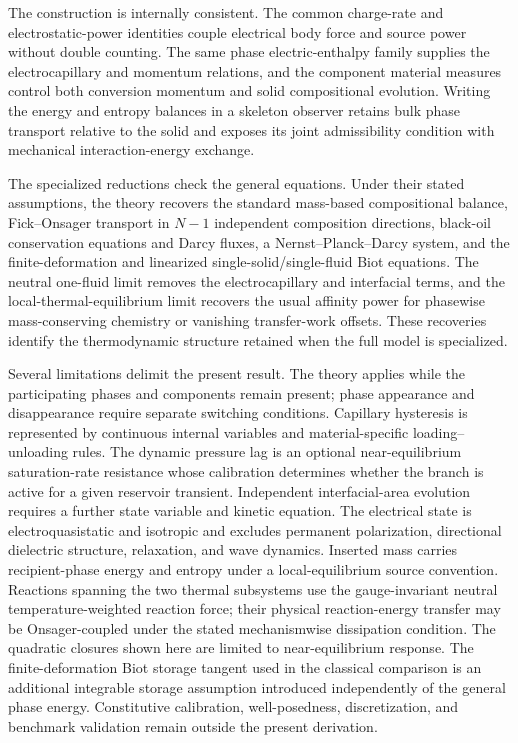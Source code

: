 The construction is internally consistent.  The common charge-rate and
electrostatic-power identities couple electrical body force and source power
without double counting.  The same phase electric-enthalpy family supplies
the electrocapillary and momentum relations, and the component material
measures control both conversion momentum and solid compositional evolution.
Writing the energy and entropy balances in a skeleton observer retains bulk
phase transport relative to the solid and exposes its joint admissibility
condition with mechanical interaction-energy exchange.

The specialized reductions check the general equations.  Under their stated
assumptions, the theory recovers the standard mass-based compositional
balance, Fick--Onsager transport in \(N-1\) independent composition
directions, black-oil conservation equations and Darcy fluxes, a
Nernst--Planck--Darcy system, and the finite-deformation and linearized
single-solid/single-fluid Biot equations.  The neutral one-fluid limit removes
the electrocapillary and interfacial terms, and the local-thermal-equilibrium
limit recovers the usual affinity power for phasewise mass-conserving
chemistry or vanishing transfer-work offsets.  These recoveries identify the
thermodynamic structure retained when the full model is specialized.

Several limitations delimit the present result.  The theory applies while the
participating phases and components remain present; phase appearance and
disappearance require separate switching conditions.  Capillary hysteresis is
represented by continuous internal variables and material-specific
loading--unloading rules.  The dynamic pressure lag is an optional
near-equilibrium saturation-rate resistance whose calibration determines
whether the branch is active for a given reservoir transient.  Independent
interfacial-area evolution requires a further state variable and kinetic
equation.  The electrical state is electroquasistatic and isotropic and
excludes permanent polarization, directional dielectric structure,
relaxation, and wave dynamics.  Inserted mass carries recipient-phase energy
and entropy under a local-equilibrium source convention.  Reactions spanning
the two thermal subsystems use the gauge-invariant neutral
temperature-weighted reaction force; their physical reaction-energy transfer
may be Onsager-coupled under the stated mechanismwise dissipation condition.
The quadratic closures shown here are limited to near-equilibrium response.
The finite-deformation Biot storage tangent used in the classical comparison
is an additional integrable storage assumption introduced independently of
the general phase energy.  Constitutive calibration, well-posedness,
discretization, and benchmark validation remain outside the present
derivation.

